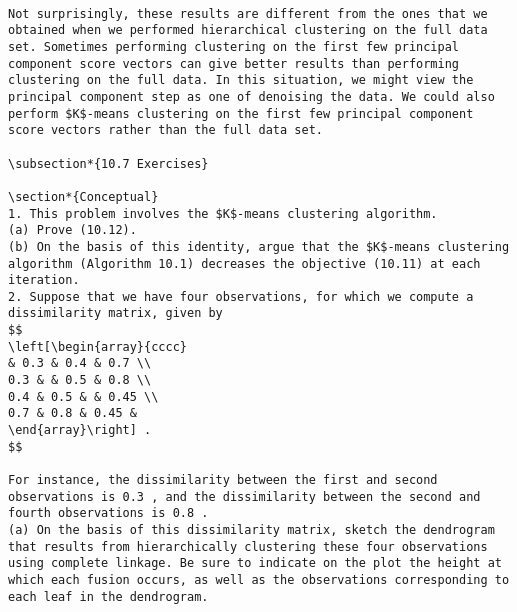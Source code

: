 \documentclass[10pt]{article}
\begin{document}
\begin{verbatim}

Not surprisingly, these results are different from the ones that we obtained when we performed hierarchical clustering on the full data set. Sometimes performing clustering on the first few principal component score vectors can give better results than performing clustering on the full data. In this situation, we might view the principal component step as one of denoising the data. We could also perform $K$-means clustering on the first few principal component score vectors rather than the full data set.

\subsection*{10.7 Exercises}

\section*{Conceptual}
1. This problem involves the $K$-means clustering algorithm.
(a) Prove (10.12).
(b) On the basis of this identity, argue that the $K$-means clustering algorithm (Algorithm 10.1) decreases the objective (10.11) at each iteration.
2. Suppose that we have four observations, for which we compute a dissimilarity matrix, given by
$$
\left[\begin{array}{cccc} 
& 0.3 & 0.4 & 0.7 \\
0.3 & & 0.5 & 0.8 \\
0.4 & 0.5 & & 0.45 \\
0.7 & 0.8 & 0.45 &
\end{array}\right] .
$$

For instance, the dissimilarity between the first and second observations is 0.3 , and the dissimilarity between the second and fourth observations is 0.8 .
(a) On the basis of this dissimilarity matrix, sketch the dendrogram that results from hierarchically clustering these four observations using complete linkage. Be sure to indicate on the plot the height at which each fusion occurs, as well as the observations corresponding to each leaf in the dendrogram.


\end{verbatim}
\end{document}
